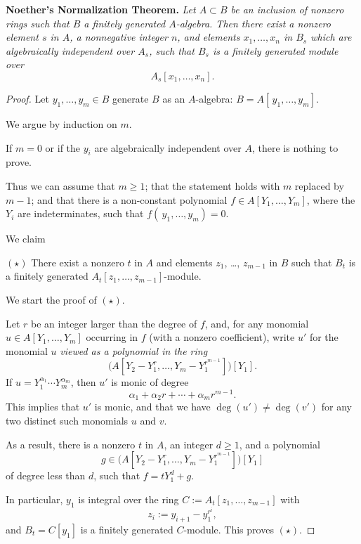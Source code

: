 \documentclass[parskip=half,fontsize=12pt]{scrartcl}%
\begin{document}
\textbf{Noether's Normalization Theorem.} \emph{Let $A\subset B$ be an inclusion of nonzero rings such that $B$ a finitely generated $A$-algebra. Then there exist a nonzero element $s$ in $A$, a nonnegative integer $n$, and elements $x_1,\dots,x_n$ in $B_s$ which are algebraically independent over $A_s$, such that $B_s$ is a finitely generated module over} 
$$
A_s[x_1,\dots,x_n].
$$ 
\begin{proof} 
Let $y_1,\dots,y_m\in B$ generate $B$ as an $A$-algebra: $B=A[\,y_1,\dots,y_m]$. 

We argue by induction on $m$. 

If $m=0$ or if the $y_i$ are algebraically independent over $A$, there is nothing to prove.

Thus we can assume that $m\ge1$; that the statement holds with $m$ replaced by $m-1$; and that there is a non-constant polynomial $f\in A[Y_1,\dots,Y_m]$, where the $Y_i$ are indeterminates, such that $f(\,y_1,\dots,y_m)=0$. %

We claim

$(\star)$ There exist a nonzero $t$ in $A$ and elements $z_1$, \dots, $z_{m-1}$ in $B$ such that $B_t$ is a finitely generated $A_t[z_1,\dots,z_{m-1}]$-module. 

We start the proof of $(\star)$. 

Let $r$ be an integer larger than the degree of $f$, and, for any monomial $u\in A[Y_1,\dots,Y_m]$ occurring in $f$ (with a nonzero coefficient), write $u'$ for the monomial $u$ \emph{viewed as a polynomial in the ring} 
$$
\bigg(A\left[Y_2-Y_1^r,\dots,Y_m-Y_1^{r^{m-1}}\right]\bigg)[Y_1].
$$ 
If $u=Y_1^{\alpha_1}\cdots Y_m^{\alpha_m}$, then $u'$ is monic of degree 
$$
\alpha_1+\alpha_2r+\cdots+\alpha_mr^{m-1}.
$$ 
This implies that $u'$ is monic, and that we have $\deg(u')\ne\deg(v')$ for any two distinct such monomials $u$ and $v$. %

As a result, there is a nonzero $t$ in $A$, an integer $d\ge1$, and a polynomial 
$$
g\in\bigg(A\left[Y_2-Y_1^r,\dots,Y_m-Y_1^{r^{m-1}}\right]\bigg)[Y_1]
$$ 
of degree less than $d$, such that $f=tY_1^d+g$. 

In particular, $y_1$ is integral over the ring $C:=A_t[z_1,\dots,z_{m-1}]$ 
with 
$$
z_i:=y_{i+1}-y_1^{r^i},
$$ 
and $B_t=C[y_1]$ is a finitely generated $C$-module. This proves $(\star)$.


\end{proof}
\end{document}

